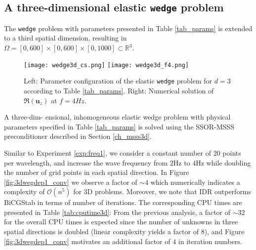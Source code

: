 \subsection{A three-dimensional elastic \texttt{wedge} problem}
\label{ch:wedge3d}
The \texttt{wedge} problem with parameters presented in Table \ref{tab_params} is extended to a third spatial dimension, resulting in $\Omega = [0,600] \times [0,600] \times[0,1000] \subset \mathbb{R}^3$.
\begin{figure}[ht]
  \texttt{[image: wedge3d\_cs.png]} \hfill
  \texttt{[image: wedge3d\_f4.png]}
  \caption{Left: Parameter configuration of the elastic \texttt{wedge} problem for $d=3$ according to Table \ref{tab_params}. Right: Numerical solution of $\Re(\mathbf{u}_z)$ at $f= 4 Hz$.}\label{fig:3dwegdep1}
\label{fig:wedge3d_par}
\end{figure}

\begin{exper} \label{ex:num_3d}
A three-dim- ensional, inhomogeneous elastic wedge problem with physical parameters specified in Table \ref{tab_params} is solved using the SSOR-MSSS preconditioner described in Section \ref{ch_msss3d}.
\end{exper}

Similar to Experiment \ref{exp:freq1}, we consider a constant number of $20$ points per wavelength, and increase the wave frequency from $2$Hz to $4$Hz while doubling the number of grid points in each spatial direction. In Figure \ref{fig:3dwegdep1_conv} we observe a factor of $\sim 4$ which numerically indicates a complexity of $\mathcal{O}(n^5)$ for 3D problems. Moreover, we note that IDR outperforms BiCGStab in terms of number of iterations. The corresponding CPU times are presented in Table \ref{tab:cputime3d}: From the previous analysis, a factor of $\sim 32$ for the overall CPU times is expected since the number of unknowns in three spatial directions is doubled (linear complexity yields a factor of $8$), and Figure \ref{fig:3dwegdep1_conv} motivates an additional factor of $4$ in iteration numbers. 

